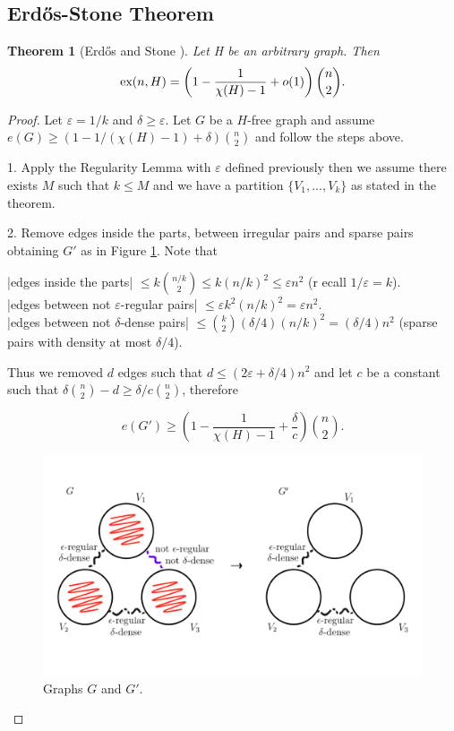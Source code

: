 \documentclass[12pt,twoside,a4paper,bibliography=totocnumbered]{book}
\numberwithin{equation}{section}
\newtheorem{theorem}             {Theorem}[section]
\theoremstyle{remark}
\def\ex{\mathop{\text{\rm ex}}\nolimits}
\begin{document}
\subsection{Erd\H{o}s-Stone Theorem}

\begin{theorem}[{Erd\H{o}s and Stone \cite{ErSt46}}] Let H be an arbitrary graph. Then
$$ \ex(n,H) = \left(1-\frac{1}{\chi (H)-1} + o(1)\right) \binom{n}{2}.$$ 
\end{theorem}

\begin{proof}
Let $\varepsilon = 1/k$ and $\delta \geq \varepsilon$. Let $G$ be a $H$-free graph and assume $e(G) \geq (1 - 1/(\chi(H) - 1) + \delta)\binom{n}{2}$ and follow the steps above.

1. Apply the Regularity Lemma  with $\varepsilon$ defined previously then we assume there exists $M$ such that $k \leq M$ and we have a partition $\{V_1, \ldots , V_k\}$ as stated in the theorem.

2. Remove edges inside the parts, between irregular pairs and sparse pairs obtaining $G'$ as in Figure \ref{fig:graph-G-and-G'}.
Note that

|edges inside the parts| $\leq k\binom{n/k}{2} \leq k(n/k)^2 \leq \varepsilon n^2$ (r
ecall $1/\varepsilon = k$).\\

|edges between not $\varepsilon$-regular pairs| $\leq \varepsilon k^2 (n/k)^2 = \varepsilon n^2$.\\

|edges between not $\delta$-dense pairs| $\leq \binom{k}{2}(\delta/4) (n/k)^2 = (\delta/4) n^2$ (sparse pairs with density at most $\delta/4$).

Thus we removed $d$ edges such that $d \leq (2\varepsilon + \delta/4)n^2$ and let $c$ be a constant such that $\delta \binom{n}{2} -d \geq \delta /c \binom{n}{2}$, therefore 

$$ e(G') \geq  \left( 1 - \frac{1}{\chi(H) - 1} + \frac{\delta}{c}\right) \binom{n}{2}.$$

\begin{figure}[H]
     \centering
     \includegraphics[scale=1.5]{Figuras/graph-G-and-G'.jpg}
     \caption{Graphs $G$ and $G'$.}
     \label{fig:graph-G-and-G'}
\end{figure}


\end{proof}
\end{document}
